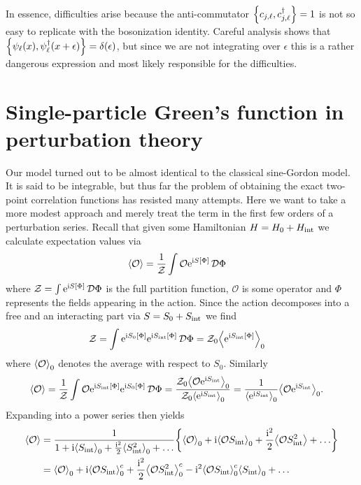 \documentclass[english, parskip=full]{scrartcl}
\begin{document}
In essence, difficulties arise because the anti-commutator $\klc*{c_{j,\ell}, c_{j,\ell}^\dagger} = 1$ is not so easy to replicate with the bosonization identity.
Careful analysis shows that $\klc*{\psi_\ell(x), \psi_\ell^\dagger(x+\epsilon)} = \delta(\epsilon)$, but since we are not integrating over $\epsilon$ this is a rather dangerous expression and most likely responsible for the difficulties.
\section{Single-particle Green's function in perturbation theory}
Our model turned out to be almost identical to the classical sine-Gordon model.
It is said to be integrable, but thus far the problem of obtaining the exact two-point correlation functions has resisted many attempts.
Here we want to take a more modest approach and merely treat the term in the first few orders of a perturbation series.
Recall that given some Hamiltonian $H=H_0+H_\Text{int}$ we calculate expectation values via
\begin{align}
\bra*{\mathcal{O}} &= \frac{1}{\mathcal{Z}} \int \mathcal{O} \powe{\i S[\Phi]}\,\mathcal{D}\Phi
\end{align} 
where $\mathcal{Z} = \int \powe{\i S[\Phi]}\,\mathcal{D}\Phi$ is the full partition function, $\mathcal{O}$ is some operator and $\Phi$ represents the fields appearing in the action.
Since the action decomposes into  a free and an interacting part via $S=S_0 + S_\Text{int}$ we find
\begin{align}
\mathcal{Z} &= \int \powe{\i S_0[\Phi]} \powe{\i S_\Text{int}[\Phi]}\,\mathcal{D}\Phi = \mathcal{Z}_0 \bra*{\powe{\i S_\Text{int}[\Phi]}}_0
\end{align}
where $\bra*{\mathcal{O}}_0$ denotes the average with respect to $S_0$.
Similarly
\begin{align}
\bra*{\mathcal{O}} &= \frac{1}{\mathcal{Z}}\int \mathcal{O} \powe{\i S_\Text{int}[\Phi]} \powe{\i S_0[\Phi]} \,\mathcal{D}\Phi = \frac{\mathcal{Z}_0 \bra*{\mathcal{O}\powe{\i S_\Text{int}}}_0}{\mathcal{Z}_0 \bra*{\powe{\i S_\Text{int}}}_0} = \frac{1}{\bra*{\powe{\i S_\Text{int}}}_0} \bra*{\mathcal{O}\powe{\i S_\Text{int}}}_0.
\end{align}
Expanding into a power series then yields
\begin{align}
\bra*{\mathcal{O}} &= \frac{1}{1 + \i \bra*{S_\Text{int}}_0 + \frac{\i^2}{2} \bra*{S_\Text{int}^2}_0 + \dots} \klc*{\bra*{\mathcal{O}}_0 + \i\bra*{\mathcal{O}S_\Text{int}}_0 + \frac{\i^2}{2} \bra*{\mathcal{O} S_\Text{int}^2} + \dots}\\
&= \bra*{\mathcal{O}}_0 + \i\bra*{\mathcal{O}S_\Text{int}}_0^c + \frac{\i^2}{2} \bra*{\mathcal{O}S_\Text{int}^2}_0^c - \i^2 \bra*{\mathcal{O}S_\Text{int}}_0^c \bra*{S_\Text{int}}_0 + \dots
\end{align}
\end{document}
